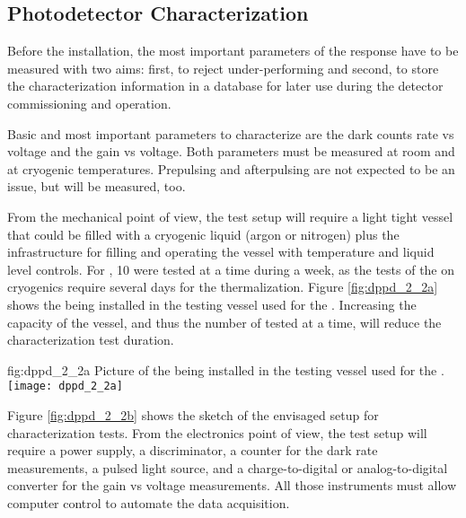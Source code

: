 \subsection{Photodetector Characterization}
\label{sec:fddp-pd-2.2}

Before the installation, the most important parameters of the  response have to be measured with two aims: first, to reject under-performing  and second, to store the characterization information in a database for later use during the detector commissioning and operation.

Basic and most important parameters to characterize are the dark counts rate vs voltage and the gain vs voltage. Both parameters must be measured at room and at cryogenic temperatures. Prepulsing and afterpulsing are not expected to be an issue, but will be measured, too. 

From the mechanical point of view, the test setup will require a light tight vessel that could be filled with a cryogenic liquid (argon or nitrogen) plus the infrastructure for filling and operating the vessel with temperature and liquid level controls. For , \num{10}  were tested at a time during a week, as the tests of the  on cryogenics require several days for the  thermalization. Figure \ref{fig:dppd_2_2a} shows the  being installed in the testing vessel used for the  . Increasing the capacity of the vessel, and thus the number of  tested at a time, will reduce the characterization test duration.

\begin{dunefigure}{fig:dppd_2_2a}
{Picture of the  being installed in the testing vessel used for the  .}
\texttt{[image: dppd\_2\_2a]}
\end{dunefigure}

Figure \ref{fig:dppd_2_2b} shows the sketch of the envisaged setup for  characterization tests. From the electronics point of view, the test setup will require a  power supply, a discriminator, a counter for the dark rate measurements, a pulsed light source, and a charge-to-digital or analog-to-digital converter for the  gain vs voltage measurements. All those instruments must allow computer control to automate the data acquisition.

